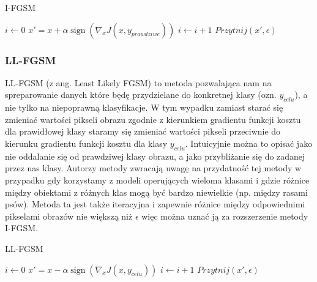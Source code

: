 \documentclass{article}
\begin{document}
    \begin{algorithm}
    \caption{I-FGSM}\label{IFGSM}
    \begin{algorithmic}[1]
    \State $i \gets 0$
        \State $x' = x + \alpha\operatorname{sign}(\nabla_{x} J(x, y_{prawdziwe}))$
        \State $i \gets i+1$
        \State $Przytnij(x', \epsilon)$
    \EndWhile
    \end{algorithmic}
    \end{algorithm}

    \subsubsection{LL-FGSM}
    LL-FGSM (z ang. Least Likely FGSM) to metoda pozwalająca nam na spreparowanie danych które będę przydzielane do
    konkretnej klasy (ozn. $y_{celu}$), a nie tylko na niepoprawną klasyfikacje. W tym wypadku zamiast starać się
    zmieniać wartości pikseli obrazu zgodnie z kierunkiem gradientu funkcji kosztu dla prawidłowej klasy
    staramy się zmieniać wartości pikseli przeciwnie do kierunku gradientu funkcji kosztu dla klasy $y_{celu}$.
    Intuicyjnie można to opisać jako nie oddalanie się od prawdziwej klasy obrazu, a jako przybliżanie się do zadanej
    przez nas klasy.
    Autorzy metody zwracają uwagę na przydatność tej metody
    w przypadku gdy korzystamy z modeli operujących wieloma klasami i gdzie różnice między obiektami z różnych klas mogą
    być bardzo niewielkie (np. między rasami psów). Metoda ta jest także iteracyjna i zapewnie różnice między
    odpowiednimi pikselami obrazów nie większą niż $\epsilon$ więc można uznać ją za rozszerzenie metody I-FGSM.

    \begin{algorithm}
    \caption{LL-FGSM}\label{LLFGSM}
    \begin{algorithmic}[1]
    \State $i \gets 0$
        \State $x' = x - \alpha\operatorname{sign}(\nabla_{x} J(x, y_{celu}))$
        \State $i \gets i+1$
        \State $Przytnij(x', \epsilon)$
    \EndWhile
    \end{algorithmic}
    \end{algorithm}
\end{document}
